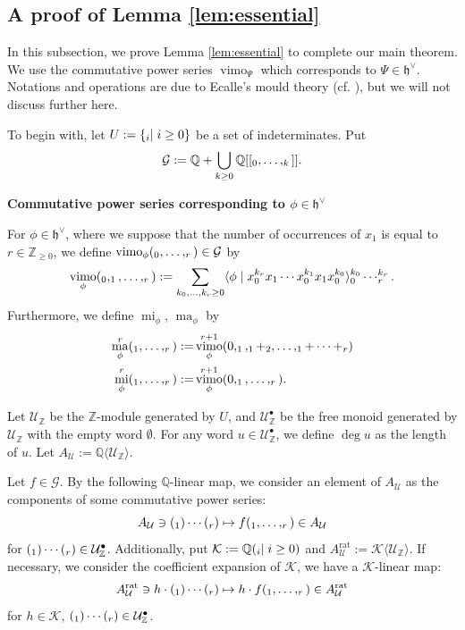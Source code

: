 \documentclass[15pt,oneside,reqno]{amsart}
\theoremstyle{remark}{
\newtheorem{lem}[df]{Lemma}
\newtheorem{prop}[df]{Proposition}
\newtheorem{ex}[df]{Example}
\newtheorem{rmk}[df]{Remark}
}
\newcommand{\ide}[1]{\mathfrak{#1}}
\newcommand{\Z}{\mathbb{Z}}
\newcommand{\Q}{\mathbb{Q}}
\DeclareMathOperator{\mi}{mi}
\DeclareMathOperator{\ma}{ma}
\DeclareMathOperator{\vimo}{vimo}
\let\u\relax
\newcommand{\u}{\mathrm{u}}
\let\v\relax
\newcommand{\v}{\mathrm{v}}
\newcommand{\nsubsection}[1]{%
  \par\bigskip
  \noindent\textbf{#1}\par
  \medskip
}
\begin{document}

\subsection{A proof of Lemma \ref{lem:essential}}\label{section:proof of lemma}

In this subsection, we prove Lemma \ref{lem:essential} to complete our main theorem.
We use the commutative power series $\vimo_{\Psi}$ which corresponds to $\Psi \in \ide{h}^{\vee}$.
Notations and operations are due to Ecalle's mould theory (cf. \cite{Ecalle}), but we will not discuss further here.


To begin with, let $U: = \{\u_i \mid i\ge 0\}$ be a set of indeterminates. Put 
\[
\mathcal{G} := \Q + \bigcup_{k\ge 0}\Q[[\u_0,\ldots,\u_k]].
\]


\nsubsection{Commutative power series corresponding to $\phi \in \ide{h}^{\vee}$}

For $\phi \in \ide{h}^{\vee}$, where we suppose that the number of occurrences of $x_1$ is equal to $r\in\mathbb{Z}_{\ge 0}$, we define $\vimo_{\phi}(\u_0,\ldots,\u_r)\in \mathcal{G}$ by
\[
\vimo_{\phi}(\u_0,\u_1,\ldots,\u_r) := \sum_{k_0,\ldots,k_r \ge 0} \langle \phi\mid x_0^{k_r}x_1\cdots x_0^{k_1}x_1x_0^{k_0} \rangle \u_0^{k_0}\cdots \u_r^{k_r}.
\]
Furthermore, we define $\mi_{\phi}$, $\ma_{\phi}$ by
\begin{align*}
\ma_{\phi}^r(\u_1,\ldots,\u_r) :=& \vimo_{\phi}^{r+1}(0,\u_1,\u_1+\u_2,\ldots,\u_1+\cdots + \u_r)\\
\mi_{\phi}^r(\u_1,\ldots,\u_r) :=& \vimo_{\phi}^{r+1}(0,\u_1,\ldots,\u_r).
\end{align*}

Let $\mathcal{U}_{\Z}$ be the $\Z$-module generated by $U$, and $\mathcal{U}_{\Z}^{\bullet}$ be the free monoid generated by $\mathcal{U}_{\Z}$ with the empty word $\emptyset$.
 For any word $u \in \mathcal{U}_{\Z}^{\bullet}$, we define $\deg u$ as the length of $u$. Let $A_{\mathcal{U}} := \Q \langle \mathcal{U}_{\Z}\rangle$.

Let $f \in \mathcal{G}$.
By the following $\Q$-linear map, we consider an element of $A_{\mathcal{U}}$ as the components of some commutative power series:
\[
A_{\mathcal{U}}\ni (\v_1)\cdots (\v_r) \mapsto f(\v_1,\ldots,\v_r) \in A_{\mathcal{U}}
\]
for $(\v_1)\cdots (\v_r) \in \mathcal{U}_{\Z}^{\bullet}$.
Additionally, put $\mathcal{K}:= \Q(\u_i \mid i\ge 0)$ and $A_{\mathcal{U}}^{\text{rat}} := \mathcal{K}\langle \mathcal{U}_{\Z}\rangle$.
If necessary, we consider the coefficient expansion of $\mathcal{K}$, we have a $\mathcal{K}$-linear map:
\[
A_{\mathcal{U}}^{\text{rat}}\ni h\cdot (\v_1)\cdots (\v_r) \mapsto h\cdot f(\v_1,\ldots,\v_r) \in A_{\mathcal{U}}^{\text{rat}}
\]
for $h \in \mathcal{K}$, $(\v_1)\cdots (\v_r) \in \mathcal{U}_{\Z}^{\bullet}$.
\end{document}

